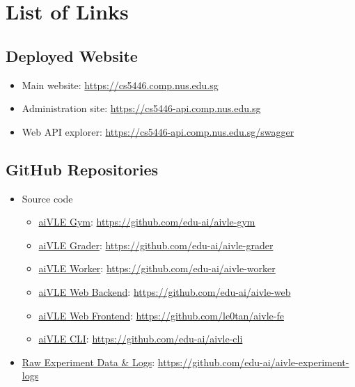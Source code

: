 \chapter{List of Links}
\label{appendix:links}

\section{Deployed Website}
\begin{itemize}
    \item Main website: \href{https://cs5446.comp.nus.edu.sg}{https://cs5446.comp.nus.edu.sg}
    \item Administration site: \href{https://cs5446-api.comp.nus.edu.sg/api/v1/}{https://cs5446-api.comp.nus.edu.sg}
    \item Web API explorer: \href{https://cs5446-api.comp.nus.edu.sg/swagger/}{https://cs5446-api.comp.nus.edu.sg/swagger}
\end{itemize}

\section{GitHub Repositories}
\label{as:links-source_code}
\begin{itemize}
    \item Source code
    \begin{itemize}
        \item \href{https://github.com/edu-ai/aivle-gym}{aiVLE Gym}: \href{https://github.com/edu-ai/aivle-gym}{https://github.com/edu-ai/aivle-gym}
        \item \href{https://github.com/edu-ai/aivle-grader}{aiVLE Grader}: \href{https://github.com/edu-ai/aivle-grader}{https://github.com/edu-ai/aivle-grader}
        \item \href{https://github.com/edu-ai/aivle-worker}{aiVLE Worker}: \href{https://github.com/edu-ai/aivle-worker}{https://github.com/edu-ai/aivle-worker}
        \item \href{https://github.com/edu-ai/aivle-web}{aiVLE Web Backend}: \href{https://github.com/edu-ai/aivle-web}{https://github.com/edu-ai/aivle-web}
        \item \href{https://github.com/le0tan/aivle-fe}{aiVLE Web Frontend}: \href{https://github.com/le0tan/aivle-fe}{https://github.com/le0tan/aivle-fe}
        \item \href{https://github.com/edu-ai/aivle-cli}{aiVLE CLI}: \href{https://github.com/edu-ai/aivle-cli}{https://github.com/edu-ai/aivle-cli}
    \end{itemize}
    \item \href{https://github.com/edu-ai/aivle-experiment-logs}{Raw Experiment Data \& Logs}: \href{https://github.com/edu-ai/aivle-experiment-logs}{https://github.com/edu-ai/aivle-experiment-logs}
\end{itemize}

